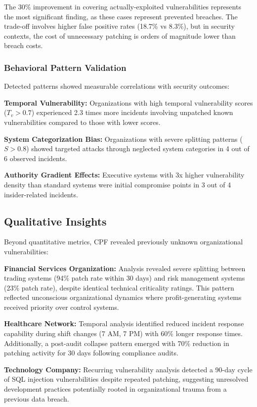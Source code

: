 \documentclass[10pt, twocolumn]{article}
\begin{document}
The 30\% improvement in covering actually-exploited vulnerabilities represents the most significant finding, as these cases represent prevented breaches. The trade-off involves higher false positive rates (18.7\% vs 8.3\%), but in security contexts, the cost of unnecessary patching is orders of magnitude lower than breach costs.

\subsubsection{Behavioral Pattern Validation}

Detected patterns showed measurable correlations with security outcomes:

\textbf{Temporal Vulnerability:} Organizations with high temporal vulnerability scores ($T_v > 0.7$) experienced 2.3 times more incidents involving unpatched known vulnerabilities compared to those with lower scores.

\textbf{System Categorization Bias:} Organizations with severe splitting patterns ($S > 0.8$) showed targeted attacks through neglected system categories in 4 out of 6 observed incidents.

\textbf{Authority Gradient Effects:} Executive systems with 3x higher vulnerability density than standard systems were initial compromise points in 3 out of 4 insider-related incidents.

\subsection{Qualitative Insights}

Beyond quantitative metrics, CPF revealed previously unknown organizational vulnerabilities:

\textbf{Financial Services Organization:} Analysis revealed severe splitting between trading systems (94\% patch rate within 30 days) and risk management systems (23\% patch rate), despite identical technical criticality ratings. This pattern reflected unconscious organizational dynamics where profit-generating systems received priority over control systems.

\textbf{Healthcare Network:} Temporal analysis identified reduced incident response capability during shift changes (7 AM, 7 PM) with 60\% longer response times. Additionally, a post-audit collapse pattern emerged with 70\% reduction in patching activity for 30 days following compliance audits.

\textbf{Technology Company:} Recurring vulnerability analysis detected a 90-day cycle of SQL injection vulnerabilities despite repeated patching, suggesting unresolved development practices potentially rooted in organizational trauma from a previous data breach.
\end{document}

